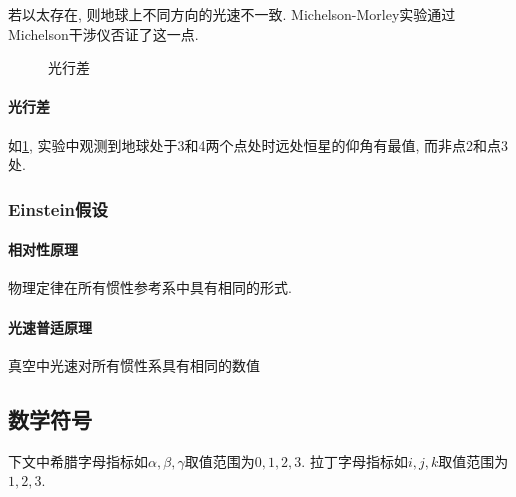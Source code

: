 \documentclass[hidelinks]{ctexart}
\begin{document}
若以太存在, 则地球上不同方向的光速不一致. Michelson-Morley实验通过Michelson干涉仪否证了这一点.


\begin{figure}[ht]
    \centering
    \caption{光行差}
    \label{fig:光行差}
\end{figure}

\paragraph{光行差} %
\label{par:光行差}

如\cref{fig:光行差}, 实验中观测到地球处于3和4两个点处时远处恒星的仰角有最值, 而非点2和点3处.



\subsubsection{Einstein假设} %
\label{ssub:einstein假设}

\paragraph{相对性原理} %
\label{par:相对性原理}

物理定律在所有惯性参考系中具有相同的形式.


\paragraph{光速普适原理} %
\label{par:光速普适原理}

真空中光速对所有惯性系具有相同的数值




\subsection{数学符号} %
\label{sub:数学符号}

下文中希腊字母指标如$\alpha,\beta,\gamma$取值范围为$0,1,2,3$. 拉丁字母指标如$i,j,k$取值范围为$1,2,3$. 
\end{document}
